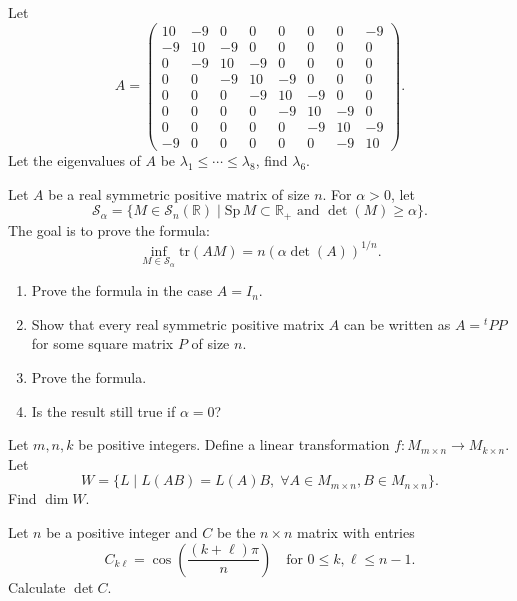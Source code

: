 \documentclass[12pt]{article}
\begin{document}
\begin{problem}
Let
\[
A = \begin{pmatrix}
10 & -9 & 0 & 0 & 0 & 0 & 0 & -9 \\
-9 & 10 & -9 & 0 & 0 & 0 & 0 & 0 \\
0 & -9 & 10 & -9 & 0 & 0 & 0 & 0 \\
0 & 0 & -9 & 10 & -9 & 0 & 0 & 0 \\
0 & 0 & 0 & -9 & 10 & -9 & 0 & 0 \\
0 & 0 & 0 & 0 & -9 & 10 & -9 & 0 \\
0 & 0 & 0 & 0 & 0 & -9 & 10 & -9 \\
-9 & 0 & 0 & 0 & 0 & 0 & -9 & 10
\end{pmatrix}.
\]
Let the eigenvalues of $A$ be $\lambda_1 \leq \cdots \leq \lambda_8$, find $\lambda_6$.
\end{problem}

\begin{problem}
Let $A$ be a real symmetric positive matrix of size $n$. For $\alpha > 0$, let
\[
\mathcal{S}_\alpha = \{M \in \mathcal{S}_n(\mathbb{R}) \mid \mathrm{Sp}\, M \subset \mathbb{R}_+ \text{ and } \det(M) \geq \alpha\}.
\]
The goal is to prove the formula:
\[
\inf_{M \in \mathcal{S}_\alpha} \mathrm{tr}(AM) = n(\alpha \det(A))^{1/n}.
\]
\begin{enumerate}[label=(\alph*)]
\item Prove the formula in the case $A = I_n$.
\item Show that every real symmetric positive matrix $A$ can be written as $A = {}^tPP$ for some square matrix $P$ of size $n$.
\item Prove the formula.
\item Is the result still true if $\alpha = 0$?
\end{enumerate}
\end{problem}

\begin{problem}
Let $m, n, k$ be positive integers. Define a linear transformation $f : M_{m\times n} \to M_{k\times n}$. Let
\[
W = \{L \mid L(AB) = L(A)B, \; \forall A \in M_{m\times n}, B \in M_{n\times n}\}.
\]
Find $\dim W$.
\end{problem}

\begin{problem}
Let $n$ be a positive integer and $C$ be the $n\times n$ matrix with entries
\[
C_{k\ell} = \cos\left(\frac{(k+\ell)\pi}{n}\right) \quad \text{for } 0 \leq k, \ell \leq n-1.
\]
Calculate $\det C$.
\end{problem}
\end{document}

